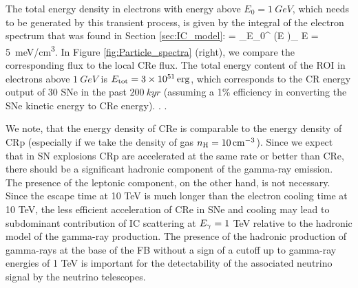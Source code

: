 The total energy density in electrons with energy above $E_0 = \SI{1}{GeV}$, which needs to be generated by this transient process, is given by the integral of the electron spectrum that was found in Section \ref{sec:IC_model}:
\be
{} = \int_{E_0}^{\infty} \left(E \right)_{\!\!\el} \de E = \SI{5}{meV/cm^3}.
\ee
In Figure \ref{fig:Particle_spectra} (right), we compare the corresponding flux to the local CRe flux.
The total energy content of the ROI in electrons above $\SI{1}{GeV}$ is $E_{\text{tot}} = \SI{3e51}{erg}$, which corresponds to the CR energy output of 30 SNe in the past $\SI{200}{kyr}$ (assuming a 1\% efficiency in converting the SNe kinetic energy to CRe energy). 
 
.  .

We note, that the energy density of CRe is comparable to the energy density of CRp 
(especially if we take the density of gas $n_{\text{H}} = \SI{10}{cm^{-3}}$).
Since we expect that in SN explosions CRp are accelerated at the same rate or better than CRe,
there should be a significant hadronic component of the gamma-ray emission.
The presence of the leptonic component, on the other hand, is not necessary.
Since the escape time at 10 TeV is much longer than the electron cooling time at 10 TeV,
the less efficient acceleration of CRe in SNe and cooling may lead to subdominant contribution of 
IC scattering at $E_\gamma = 1$ TeV relative to the hadronic model of the gamma-ray production.
The presence of the hadronic production of gamma-rays at the base of the FB without a sign of a cutoff up to gamma-ray energies
of 1 TeV is important for the detectability of the associated neutrino signal by the neutrino telescopes.

